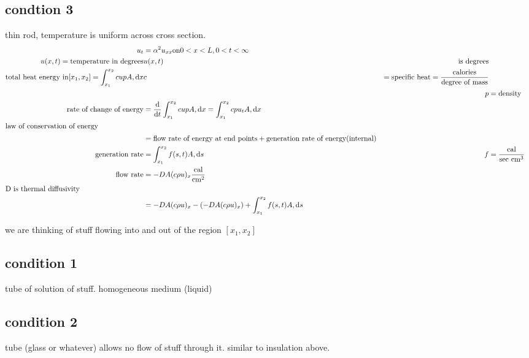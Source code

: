 \documentclass{article}
\begin{document}
\subsection*{condtion 3}
thin rod, temperature is uniform across cross section.
\begin{align*}
  u_t&=\alpha^2u_{xx} \text{on} 0<x<L, 0<t<\infty\\
  u(x,t)=\text{temperature in degrees}& u(x,t)& \text{is degrees}\\
  \text{total heat energy in} [x_1,x_2]=\int_{x_1}^{x_2}{cupA,\mathrm{d}x} & c&=\text{specific heat}=\frac{\text{calories}}{\text{degree of mass}}\\
  &&p&=\text{density}\\
  \text{rate of change of energy}&=\frac{\mathrm{d}}{\mathrm{d}t}\int_{x_1}^{x_2}{cupA,\mathrm{d}x}=\int_{x_1}^{x_2}{cpu_t A,\mathrm{d}x}\\
  \intertext{law of conservation of energy}
  &=\text{flow rate of energy at end points}+\text{generation rate of energy(internal)}\\
  \text{generation rate}&=\int_{x_1}^{x_2}{f(s,t)A,\mathrm{d}s} & f&=\frac{\text{cal}}{\text{sec cm}^3}\\
  \text{flow rate}&=-DA(c\rho u)_x \frac{\text{cal}}{\text{cm}^2}\\
  \intertext{D is thermal diffusivity}
  &=-DA(c\rho u)_x-(-DA(c\rho u)_x)+\int_{x_1}^{x_2}{f(s,t)A,\mathrm{d}s}
\end{align*}

we are thinking of stuff flowing into and out of the region $[x_1,x_2]$
\subsection*{condition 1}
tube of solution of stuff. homogeneous medium (liquid)
\subsection*{condition 2}
tube (glass or whatever) allows no flow of stuff through it. similar to insulation above.
\end{document}
